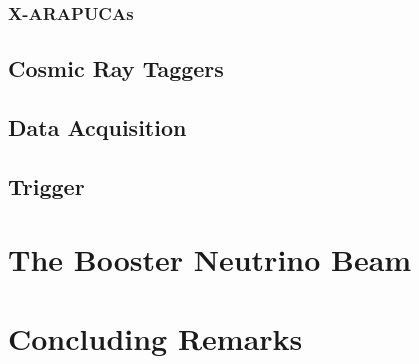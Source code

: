\subsubsection{X-ARAPUCAs}

\subsection{Cosmic Ray Taggers}

\subsection{Data Acquisition}

\subsection{Trigger}


\section{The Booster Neutrino Beam}

\section{Concluding Remarks}
